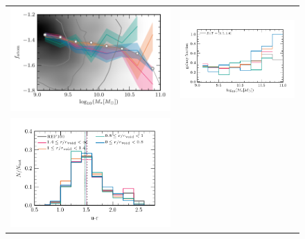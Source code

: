 \documentclass[a4paper,fleqn,usenatbib,letter]{mnras}
\begin{document}
\begin{figure}
\begin{tabular}{cc}
	\includegraphics[width=1\columnwidth]{plots_stellarmass_central/mass_gasatomfrac_threeregions.pdf}  &
	\includegraphics[width=1\columnwidth]{plots_stellarmass_central/mass_galfrac_morphology_threeregions_v1.pdf} \\
    \includegraphics[width=1\columnwidth]{plots_stellarmass_central/u_r_fraction_threeregions.png}  &

\end{tabular}
\end{figure}
\end{document}
